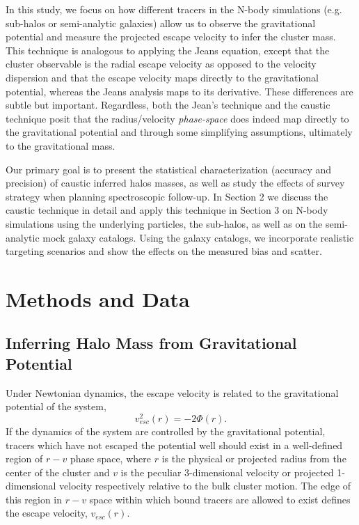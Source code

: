 \documentclass[iop]{emulateapj}
\begin{document}
In this study, we focus on how different tracers in the N-body simulations (e.g. sub-halos or semi-analytic galaxies) allow us to observe the gravitational potential and measure the projected escape velocity to infer the cluster mass. This technique is analogous to applying the Jeans equation, except that the cluster observable is the radial escape velocity as opposed to the velocity dispersion and that the escape velocity maps directly to the gravitational potential, whereas the Jeans analysis maps to its derivative. These differences are subtle but important. Regardless, both the Jean's technique and the caustic technique posit that the radius/velocity {\it phase-space} does indeed map directly to the gravitational potential and through some simplifying assumptions, ultimately to the gravitational mass.

Our primary goal is to present the  statistical characterization (accuracy and precision) of caustic inferred halos masses, as well as study the effects of survey strategy when planning spectroscopic follow-up. In Section 2 we discuss the caustic technique in detail and apply this technique in Section 3 on N-body simulations using the underlying particles, the sub-halos, as well as on the semi-analytic mock galaxy catalogs. Using the galaxy catalogs, we incorporate realistic targeting scenarios and show the effects on the measured bias and scatter.


\section{Methods and Data} \label{Methods}
    \subsection{Inferring Halo Mass from Gravitational Potential}
    \label{sec:methods_caustics}
        Under Newtonian dynamics, the escape velocity is related to the gravitational potential of the system,
        \begin{equation}
            v_{esc}^2(r) = -2\Phi(r) .
        \label{eq:escape}
        \end{equation}
        If the dynamics of the system are controlled by the gravitational potential, tracers which have not escaped the potential well should exist in a well-defined region of $r-v$ phase space, where $r$ is the physical or projected radius from the center of the cluster and $v$ is the peculiar 3-dimensional velocity or projected 1-dimensional velocity respectively relative to the bulk cluster motion. The edge of this region in $r-v$ space within which bound tracers are allowed to exist defines the escape velocity, $v_{esc}(r)$.
        
\end{document}
